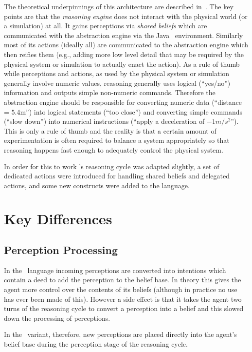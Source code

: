 \documentclass[a4]{article}
\begin{document}
The theoretical underpinnings of this architecture are described in~\cite{DALT10:abstraction}.  The key points are that the \emph{reasoning engine} does not interact with the physical world (or a simulation) at all.  It gains perceptions via \emph{shared beliefs} which are communicated with the abstraction engine via the Java \eass\ environment.  Similarly most of its actions (ideally all) are communicated to the abstraction engine which then reifies them (e.g., adding more low level detail that may be required by the physical system or simulation to actually enact the action).  As a rule of thumb while perceptions and actions, as used by the physical system or simulation generally involve numeric values, reasoning generally uses logical (``yes/no'') information and outputs simple non-numeric commands.  Therefore the abstraction engine should be responsible for converting numeric data (``distance = 5.4m'') into logical statements (``too close'') and converting simple commands (``slow down'') into numerical instructions (``apply a deceleration of $-1m/s^2$'').  This is only a rule of thumb and the reality is that a certain amount of experimentation is often required to balance a system appropriately so that reasoning happens fast enough to adequately control the physical system.

In order for this to work \gwendolen's reasoning cycle was adapted slightly, a set of dedicated actions were introduced for handling shared beliefs and delegated actions, and some new constructs were added to the language.

\section{Key Differences}
\subsection{Perception Processing}
In the \gwendolen\ language incoming perceptions are converted into intentions which contain a deed to add the perception to the belief base.  In theory this gives the agent more control over the contents of its beliefs (although in practice no use has ever been made of this).  However a side effect is that it takes the agent two turns of the reasoning cycle to convert a perception into a belief and this slowed down the processing of perceptions.

In the \eass\ variant, therefore, new perceptions are placed directly into the agent's belief base during the perception stage of the reasoning cycle.
\end{document}
